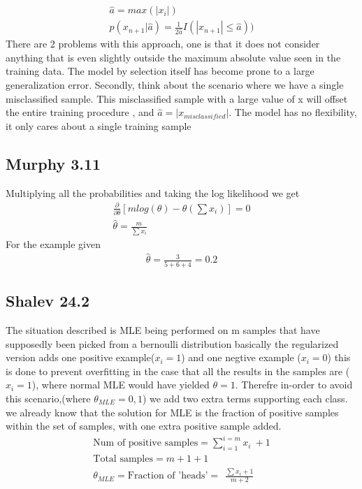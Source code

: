 \begin{gather}
    \hat{a} = max (|x_i|) \\
    p(x_{n + 1} | \hat{a}) = \frac{1}{2\hat{a}} I(|x_{n+1}| \le \hat{a}))
\end{gather}  
There are 2 problems with this approach, one is that it does not consider anything that is even slightly outside the 
maximum absolute value seen in the training data. The model by selection itself has become prone
to a large generalization error.
Secondly, think about the scenario where we have a single misclassified sample. This misclassified sample with a large value of x
will offset the entire training procedure , and $\hat{a} = |x_{misclassified}|$. The model has no flexibility, it only cares about a single training sample

\subsection{Murphy 3.11}
Multiplying all the probabilities and taking the log likelihood we get 
\begin{gather}
    \frac{\partial }{\partial \theta}[ m log (\theta)  - \theta (\sum x_i)] = 0
    \\
    \hat{\theta} = \frac{m}{\sum x_i}
\end{gather}
For the example given 
\begin{gather}
    \hat{\theta} = \frac{3}{5 + 6 + 4} = 0.2
\end{gather}

\subsection{Shalev 24.2}
The situation described is MLE being performed on m samples that have supposedly been picked from a bernoulli distribution
basically the regularized version adds one positive example($x_i = 1$) and one negtive example ($x_i = 0$) this is done to prevent overfitting in the case that
all the results in the samples are ($x_i = 1$), where normal MLE would have yielded $\theta = 1$. Therefre in-order to avoid this scenario,(where $\theta_{MLE}  = 0 , 1$)
we add two extra terms supporting each class.
we already know that the solution for MLE is the fraction of positive samples within the set of samples, with one extra positive sample added.
\begin{gather*}
    \text{Num of positive samples} = \sum_{i = 1}^{i = m} x_i  \ +  1 \\
    \text{Total samples} = m + 1 + 1 \\
    \theta_{MLE} = \text{Fraction of 'heads'}   =  \ \ \frac{\sum {x_i} + 1}{m + 2} \\
\end{gather*}

